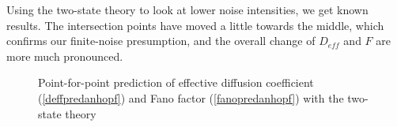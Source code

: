 \documentclass[12pt,a4paper]{article}
\begin{document}
Using the two-state theory to look at lower noise intensities, we get known results. The intersection points have moved a little towards the middle, which confirms our finite-noise presumption, and the overall change of $D_{eff}$ and $F$ are more much pronounced.
\begin{figure}[H]
	\hspace*{-0.5cm}
	\caption{Point-for-point prediction of effective diffusion coefficient (\ref{deffpredanhopf}) and Fano factor (\ref{fanopredanhopf}) with the two-state theory}
\end{figure}
\end{document}
